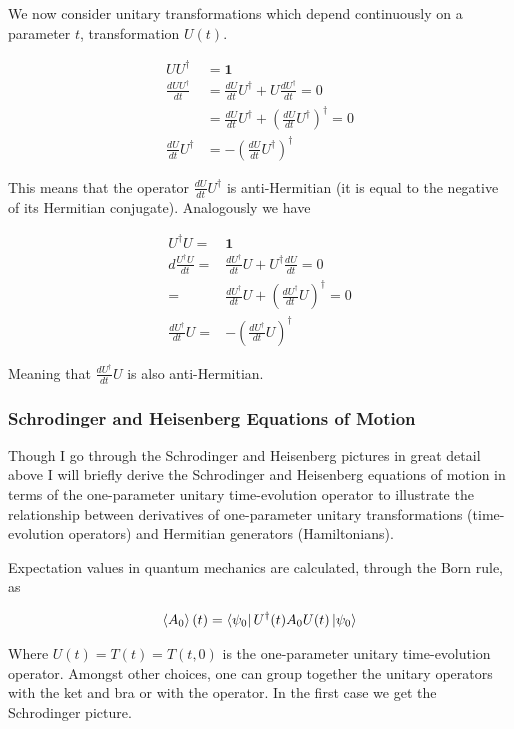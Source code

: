 \documentclass[12pt]{article}
\newcommand{\bv}[1]{\boldsymbol{#1}}
\begin{document}
We now consider unitary transformations which depend continuously on a parameter $t$, transformation $U(t)$.

\begin{align}
UU^{\dag} &= \bv{1}\\
\frac{dUU^{\dag}}{dt} &= \frac{dU}{dt} U^{\dag} + U\frac{dU^{\dag}}{dt} = 0\\
&= \frac{dU}{dt}U^{\dag} + \left(\frac{dU}{dt}U^{\dag}\right)^{\dag} = 0\\
\frac{dU}{dt}U^{\dag} &= -\left(\frac{dU}{dt}U^{\dag}\right)^{\dag}
\end{align}

This means that the operator $\frac{dU}{dt}U^{\dag}$ is anti-Hermitian (it is equal to the negative of its Hermitian conjugate).
Analogously we have

\begin{align}
U^{\dag}U =& \bv{1}\\
d\frac{U^{\dag}U}{dt} =& \frac{dU^{\dag}}{dt}U + U^{\dag}\frac{dU}{dt} = 0\\
=& \frac{dU^{\dag}}{dt}U + \left(\frac{dU^{\dag}}{dt}U\right)^{\dag} = 0\\
\frac{dU^{\dag}}{dt}U =& -\left(\frac{dU^{\dag}}{dt}U\right)^{\dag}
\end{align}

Meaning that $\frac{dU^{\dag}}{dt}U$ is also anti-Hermitian.

\subsubsection{Schrodinger and Heisenberg Equations of Motion}
Though I go through the Schrodinger and Heisenberg pictures in great detail above I will briefly derive the Schrodinger and Heisenberg equations of motion in terms of the one-parameter unitary time-evolution operator to illustrate the relationship between derivatives of one-parameter unitary transformations (time-evolution operators) and Hermitian generators (Hamiltonians).

Expectation values in quantum mechanics are calculated, through the Born rule, as 

\begin{align}
\braket{A_0}(t) = \bra{\psi_0}U^{\dag}(t)A_0U(t)\ket{\psi_0}
\end{align}

Where $U(t) = T(t) = T(t, 0)$ is the one-parameter unitary time-evolution operator.
Amongst other choices, one can group together the unitary operators with the ket and bra or with the operator.
In the first case we get the Schrodinger picture.
\end{document}
